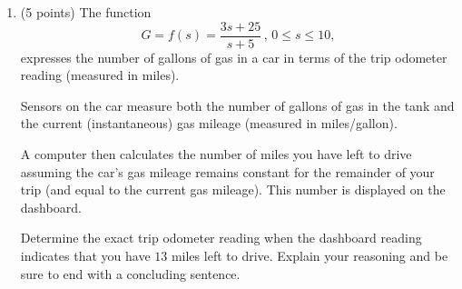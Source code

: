 \documentclass{ximera}
\begin{document}
\begin{enumerate}
\begin{explanation}
\begin{enumerate}
\end{enumerate}
\end{explanation}














\item (5 points) The function
\[
       G = f(s) = \frac{3s+25}{s+5} \, , \, 0\leq s \leq 10 ,
\]
expresses the number of gallons of gas in a car in terms of the trip odometer reading (measured in miles).

Sensors on the car measure both the number of gallons of gas in the tank and the current (instantaneous) gas mileage (measured in miles/gallon).

A computer then calculates the number of miles you have left to drive assuming the car's gas mileage remains constant for the remainder of your trip (and equal to the current gas mileage). This number is displayed on the dashboard.

Determine the exact trip odometer reading when the dashboard reading indicates that you have $13$ miles left to drive. Explain your reasoning and be sure to end with a concluding sentence.

\begin{explanation}


\end{explanation}
\end{enumerate}
\end{document}
